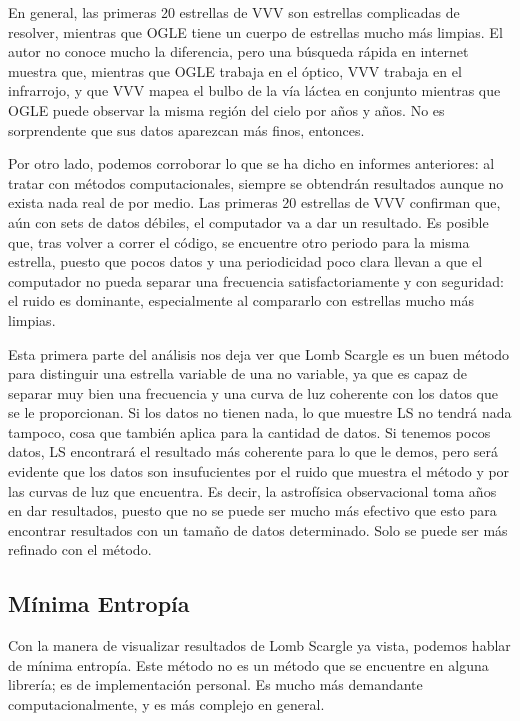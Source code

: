\documentclass[10pt,twocolumn]{article}
\begin{document}
En general, las primeras 20 estrellas de VVV son estrellas complicadas de resolver, mientras que OGLE tiene un cuerpo de estrellas
mucho más limpias. El autor no conoce mucho la diferencia, pero una búsqueda rápida en internet muestra que, mientras que OGLE
trabaja en el óptico, VVV trabaja en el infrarrojo, y que VVV mapea el bulbo de la vía láctea en conjunto mientras que OGLE 
puede observar la misma región del cielo por años y años. No es sorprendente que sus datos aparezcan más finos, entonces. 

Por otro lado, podemos corroborar lo que se ha dicho en informes anteriores: al tratar con métodos computacionales, siempre
se obtendrán resultados aunque no exista nada real de por medio. Las primeras 20 estrellas de VVV confirman que, aún con
sets de datos débiles, el computador va a dar un resultado. Es posible que, tras volver a correr el código, se encuentre
otro periodo para la misma estrella, puesto que pocos datos y una periodicidad poco clara llevan a que el computador no 
pueda separar una frecuencia satisfactoriamente y con seguridad: el ruido es dominante, especialmente al compararlo con 
estrellas mucho más limpias. 

Esta primera parte del análisis nos deja ver que Lomb Scargle es un buen método para distinguir una estrella variable de una 
no variable, ya que es capaz de separar muy bien una frecuencia y una curva de luz coherente con los datos que se le proporcionan.
Si los datos no tienen nada, lo que muestre LS no tendrá nada tampoco, cosa que también aplica para la cantidad de datos. Si 
tenemos pocos datos, LS encontrará el resultado más coherente para lo que le demos, pero será evidente que los datos son 
insufucientes por el ruido que muestra el método y por las curvas de luz que encuentra. Es decir, la astrofísica observacional
toma años en dar resultados, puesto que no se puede ser mucho más efectivo que esto para encontrar resultados con un tamaño de 
datos determinado. Solo se puede ser más refinado con el método. 

\subsection{Mínima Entropía}

Con la manera de visualizar resultados de Lomb Scargle ya vista, podemos hablar de mínima entropía. Este método no es un 
método que se encuentre en alguna librería; es de implementación personal. Es mucho más demandante computacionalmente, 
y es más complejo en general. 
\end{document}

